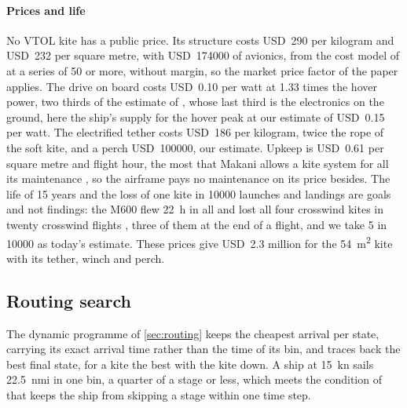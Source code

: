 \paragraph{Prices and life} No VTOL kite has a public price. Its structure costs USD~290 per kilogram and USD~232 per square metre, with USD~\num{174000} of avionics, from the cost model of \citet{joshi2025} at a series of 50 or more, without margin, so the market price factor of the paper applies. The drive on board costs USD~0.10 per watt at 1.33 times the hover power, two thirds of the estimate of \citet{bauer2018}, whose last third is the electronics on the ground, here the ship's supply for the hover peak at our estimate of USD~0.15 per watt. The electrified tether costs USD~186 per kilogram, twice the rope of the soft kite, and a perch USD~\num{100000}, our estimate. Upkeep is USD~0.61 per square metre and flight hour, the most that Makani allows a kite system for all its maintenance \citep{echeverri2020part1}, so the airframe pays no maintenance on its price besides. The life of 15 years and the loss of one kite in \num{10000} launches and landings are goals and not findings: the M600 flew 22~h in all and lost all four crosswind kites in twenty crosswind flights \citep{echeverri2020part1}, three of them at the end of a flight, and we take 5 in \num{10000} as today's estimate. These prices give USD~2.3 million for the \SI{54}{m^2} kite with its tether, winch and perch.

\subsection{Routing search}
\label{sec:det_routing}

The dynamic programme of \cref{sec:routing} keeps the cheapest arrival per state, carrying its exact arrival time rather than the time of its bin, and traces back the best final state, for a kite the best with the kite down. A ship at \SI{15}{kn} sails \SI{22.5}{nmi} in one bin, a quarter of a stage or less, which meets the condition of \citet{wendling2025} that keeps the ship from skipping a stage within one time step.

